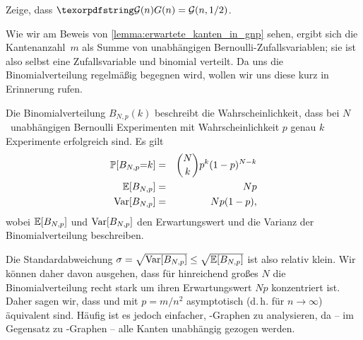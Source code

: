 \begin{exercise}
    Zeige, dass $\Gn = \mathcal G(n, 1/2)$.
\end{exercise}

\bigskip

Wie wir am Beweis von \cref{lemma:erwartete_kanten_in_gnp} sehen, ergibt sich die Kantenanzahl~$m$ als Summe von unabhängigen Bernoulli-Zufallsvariablen;
sie ist also selbst eine Zufallsvariable und binomial verteilt.
Da uns die Binomialverteilung regelmäßig begegnen wird, wollen wir uns diese kurz in Erinnerung rufen.
\begin{definition}
    Die  Binomialverteilung $B_{N, p}(k)$ beschreibt die Wahrscheinlichkeit, dass bei $N$~unabhängigen Bernoulli Experimenten mit Wahrscheinlichkeit $p$ genau $k$ Experimente erfolgreich sind.
    Es gilt 
    \begin{eqnarray*}
        \mathbb{P}\!\left[B_{N,p} {=} k\right] &=& \binom{N}{k} p^k (1-p)^{N-k} \\
        \mathbb{E}\!\left[B_{N,p}\right] &=& Np \\
        \operatorname{Var}\!\left[B_{N,p}\right] &=& Np(1-p),
    \end{eqnarray*}
    wobei $\mathbb{E}\!\left[B_{N,p}\right]$ und $\operatorname{Var}\!\left[B_{N,p}\right]$ den Erwartungswert und die Varianz der Binomialverteilung beschreiben.
\end{definition}

Die Standardabweichung $\sigma = \sqrt{\operatorname{Var}\!\left[B_{N,p}\right]} \le \sqrt{\mathbb{E}\!\left[B_{N,p}\right]}$ ist also relativ klein.
Wir können daher davon ausgehen, dass für hinreichend großes $N$ die Binomialverteilung recht stark um ihren Erwartungswert $Np$ konzentriert ist.
Daher sagen wir, dass \Gnm und \Gnp mit $p=m/n^2$ asymptotisch (d.\,h. für $n \to \infty$) äquivalent sind.
Häufig ist es jedoch einfacher, \Gnp-Graphen zu analysieren, da -- im Gegensatz zu \Gnm-Graphen -- alle Kanten unabhängig gezogen werden.

